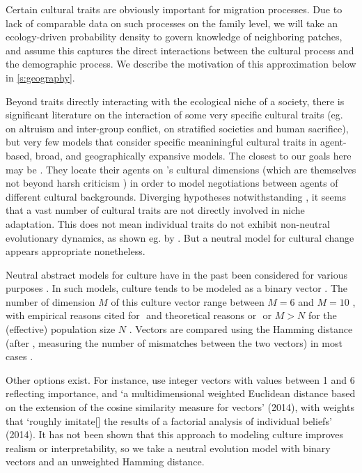 \documentclass[a4paper,12pt]{scrartcl}
\begin{document}
Certain cultural traits are obviously important for migration processes. Due to
lack of comparable data on such processes on the family level, we will take an
ecology-driven probability density to govern knowledge of neighboring patches,
and assume this captures the direct interactions between the cultural process
and the demographic process. We describe the motivation of this approximation
below in \cref{s:geography}.

Beyond traits directly interacting with the ecological niche of a society, there
is significant literature on the interaction of some very specific cultural
traits (eg. \textcite{rusch2014evolutionary} on altruism and inter-group
conflict, \textcite{watts2016ritual} on stratified societies and human
sacrifice), but very few models that consider specific meaniningful cultural
traits in agent-based, broad, and geographically expansive models. The closest
to our goals here may be \textcite{hofstede2012cultural}. They locate their
agents on \textcite{hofstede2001culture}'s cultural dimensions (which are
themselves not beyond harsh criticism
\parencite{mcsweeney2002hofstede,baskerville2003hofstede}) in order to model
negotiations between agents of different cultural backgrounds.
Diverging
hypotheses notwithstanding \parencite{tone-humidity,elevation-ejectives,etc}, it
seems that a vast number of cultural traits are not directly involved in niche
adaptation. This does not mean individual traits do not exhibit non-neutral
evolutionary dynamics, as shown eg. by \textcite{kandler2013non}. But a neutral
model for cultural change appears appropriate nonetheless.

Neutral abstract models for culture have in the past been considered for various
purposes \parencite{komarova2001evolutionary}. In such models, culture tends to
be modeled as a binary vector
\parencite{fogarty2017driving,pascual2020epistasis}. The number of dimension $M$
of this culture vector range between $M=6$ \parencite{pascual2020epistasis} and
$M=10$ \parencite{delcastillo2013modeling}, with empirical reasons cited for $ $
\parencite{} and theoretical reasons or $ $ \parencite{} or $M>N$ for the
(effective) population size $N$ \parencite{fogarty2017driving}. Vectors are
compared using the Hamming distance (after \textcite{}, measuring the number of
mismatches between the two vectors) in most cases
\parencite{fogarty2017driving,pascual2020epistasis}.

Other options exist. For instance,
\textcite{barcelo2014social,barcelo2015simulating} use integer vectors with
values between 1 and 6 reflecting importance, and ‘a multidimensional weighted
Euclidean distance based on the extension of the cosine similarity measure for
vectors’ (2014), with weights that ‘roughly imitate[] the results of a factorial
analysis of individual beliefs’ (2014). It has not been shown that this approach
to modeling culture improves realism or interpretability, so we take a neutral
evolution model with binary vectors and an unweighted Hamming distance.
\end{document}
